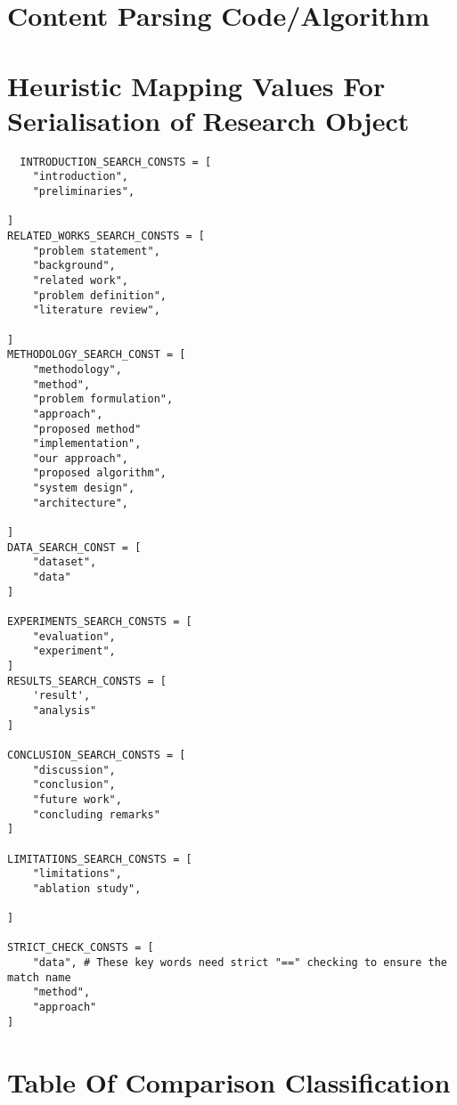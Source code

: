 \section{Content Parsing Code/Algorithm}
\label{appendix:content-parsing-code}

\section{Heuristic Mapping Values For Serialisation of Research Object}
\label{appendix:mapping-heuristic}
\begin{verbatim}
  INTRODUCTION_SEARCH_CONSTS = [
    "introduction",
    "preliminaries",
    
]
RELATED_WORKS_SEARCH_CONSTS = [
    "problem statement",
    "background",
    "related work",
    "problem definition",
    "literature review",

]
METHODOLOGY_SEARCH_CONST = [
    "methodology",
    "method",
    "problem formulation",
    "approach",
    "proposed method"
    "implementation",
    "our approach",
    "proposed algorithm",
    "system design",
    "architecture",

]
DATA_SEARCH_CONST = [
    "dataset",
    "data"
]

EXPERIMENTS_SEARCH_CONSTS = [
    "evaluation",
    "experiment",
]
RESULTS_SEARCH_CONSTS = [
    'result',
    "analysis"
]

CONCLUSION_SEARCH_CONSTS = [
    "discussion",
    "conclusion",
    "future work",
    "concluding remarks"
]

LIMITATIONS_SEARCH_CONSTS = [
    "limitations",
    "ablation study",

]

STRICT_CHECK_CONSTS = [
    "data", # These key words need strict "==" checking to ensure the match name
    "method",
    "approach"
]
\end{verbatim}

\section{Table Of Comparison Classification}
\label{appendix:toc}

